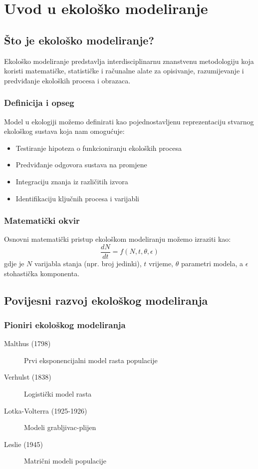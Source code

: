 \documentclass[12pt,a4paper,twoside]{book}
\begin{document}
	\chapter{Uvod u ekološko modeliranje}
	
	\section{Što je ekološko modeliranje?}
	
	Ekološko modeliranje predstavlja interdisciplinarnu znanstvenu metodologiju koja koristi matematičke, statističke i računalne alate za opisivanje, razumijevanje i predviđanje ekoloških procesa i obrazaca.
	
	\subsection{Definicija i opseg}
	Model u ekologiji možemo definirati kao pojednostavljenu reprezentaciju stvarnog ekološkog sustava koja nam omogućuje:
	\begin{itemize}
		\item Testiranje hipoteza o funkcioniranju ekoloških procesa
		\item Predviđanje odgovora sustava na promjene
		\item Integraciju znanja iz različitih izvora
		\item Identifikaciju ključnih procesa i varijabli
	\end{itemize}
	
	\subsection{Matematički okvir}
	Osnovni matematički pristup ekološkom modeliranju možemo izraziti kao:
	\begin{equation}
		\frac{dN}{dt} = f(N, t, \theta, \epsilon)
	\end{equation}
	gdje je $N$ varijabla stanja (npr. broj jedinki), $t$ vrijeme, $\theta$ parametri modela, a $\epsilon$ stohastička komponenta.
	
	\section{Povijesni razvoj ekološkog modeliranja}
	
	\subsection{Pioniri ekološkog modeliranja}
	\begin{description}
		\item[Malthus (1798)] Prvi eksponencijalni model rasta populacije
		\item[Verhulst (1838)] Logistički model rasta
		\item[Lotka-Volterra (1925-1926)] Modeli grabljivac-plijen
		\item[Leslie (1945)] Matrični modeli populacije
	\end{description}
	
\end{document}

